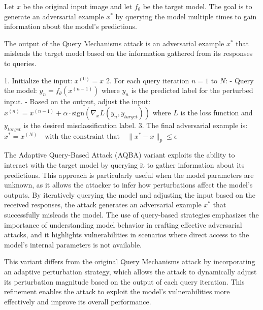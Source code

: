 Let $x$ be the original input image and let $f_{\theta}$ be the target model. The goal is to generate an adversarial example $x^*$ by querying the model multiple times to gain information about the model's predictions.

The output of the Query Mechanisms attack is an adversarial example $x^*$ that misleads the target model based on the information gathered from its responses to queries.

1. Initialize the input:
   $x^{(0)} = x$
2. For each query iteration $n = 1$ to $N$:
   - Query the model:
   $y_n = f_{\theta}(x^{(n-1)})$
   where $y_n$ is the predicted label for the perturbed input.
   - Based on the output, adjust the input:
   $x^{(n)} = x^{(n-1)} + \alpha \cdot \text{sign}(\nabla_x L(y_n, y_{target}))$
   where $L$ is the loss function and $y_{target}$ is the desired misclassification label.
3. The final adversarial example is:
   $x^* = x^{(N)} \quad \text{with the constraint that} \quad \|x^* - x\|_p \leq \epsilon$

The Adaptive Query-Based Attack (AQBA) variant exploits the ability to interact with the target model by querying it to gather information about its predictions. This approach is particularly useful when the model parameters are unknown, as it allows the attacker to infer how perturbations affect the model's outputs. By iteratively querying the model and adjusting the input based on the received responses, the attack generates an adversarial example $x^*$ that successfully misleads the model. The use of query-based strategies emphasizes the importance of understanding model behavior in crafting effective adversarial attacks, and it highlights vulnerabilities in scenarios where direct access to the model's internal parameters is not available.

This variant differs from the original Query Mechanisms attack by incorporating an adaptive perturbation strategy, which allows the attack to dynamically adjust its perturbation magnitude based on the output of each query iteration. This refinement enables the attack to exploit the model's vulnerabilities more effectively and improve its overall performance.